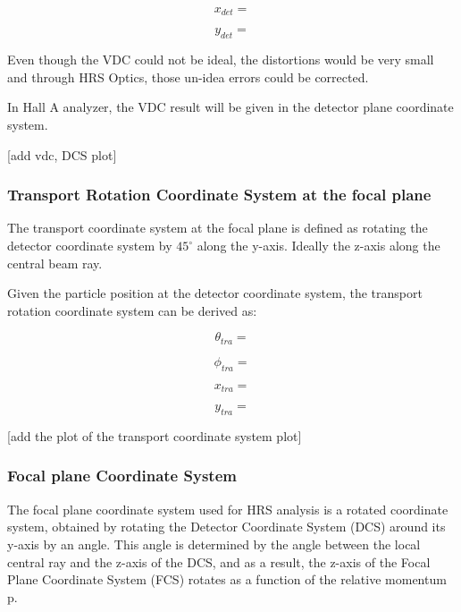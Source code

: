 \begin{equation}
    x_{det} =
\end{equation}

\begin{equation}
    y_{det} =
\end{equation}

Even though the VDC could not be ideal, the distortions would be very small and through HRS Optics, those un-idea errors could be corrected. 

In Hall A analyzer, the VDC result will be given in the detector plane coordinate system.

[add vdc, DCS plot]

\subsubsection{Transport Rotation Coordinate System at the focal plane}
The transport coordinate system at the focal plane is defined as rotating the detector coordinate system by $45^{\circ}$ along the y-axis. Ideally the z-axis along the central beam ray. 

Given the particle position at the detector coordinate system, the transport rotation coordinate system can be derived as:

\begin{equation}
    \theta_{tra}  = 
\end{equation}

\begin{equation}
    \phi_{tra} =
\end{equation}

\begin{equation}
    x_{tra} =
\end{equation}

\begin{equation}
    y_{tra} = 
\end{equation}


[add the plot of the transport coordinate system plot]


\subsubsection{Focal plane Coordinate System}

The focal plane coordinate system used for HRS analysis is a rotated coordinate system, obtained by rotating the Detector Coordinate System (DCS) around its y-axis by an angle. This angle is determined by the angle between the local central ray and the z-axis of the DCS, and as a result, the z-axis of the Focal Plane Coordinate System (FCS) rotates as a function of the relative momentum p.

